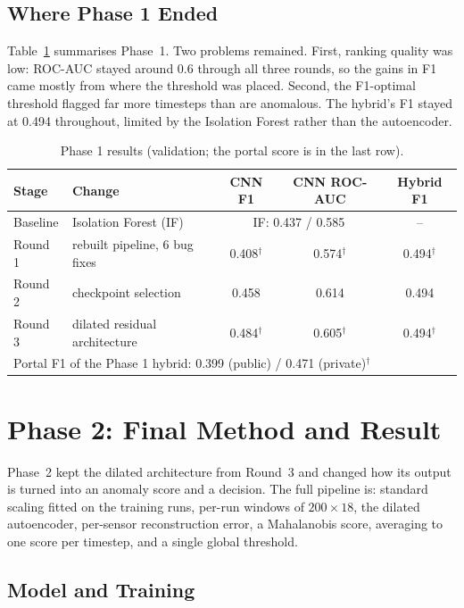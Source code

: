 \documentclass[runningheads]{llncs}
\newcommand{\doc}{$^\dagger$}
\begin{document}
\subsection{Where Phase 1 Ended}

Table~\ref{tab:phase1} summarises Phase~1. Two problems remained. First, ranking quality was low: ROC-AUC stayed around 0.6 through all three rounds, so the gains in F1 came mostly from where the threshold was placed. Second, the F1-optimal threshold flagged far more timesteps than are anomalous. The hybrid's F1 stayed at 0.494 throughout, limited by the Isolation Forest rather than the autoencoder.

\begin{table}[ht]
\centering
\caption{Phase 1 results (validation; the portal score is in the last row).}\label{tab:phase1}
\begin{tabular}{|l|l|c|c|c|}
\hline
Stage & Change & CNN F1 & CNN ROC-AUC & Hybrid F1 \\
\hline
Baseline & Isolation Forest (IF) & \multicolumn{2}{c|}{IF: 0.437 / 0.585} & -- \\
Round 1 & rebuilt pipeline, 6 bug fixes & 0.408\doc & 0.574\doc & 0.494\doc \\
Round 2 & checkpoint selection & 0.458 & 0.614 & 0.494 \\
Round 3 & dilated residual architecture & 0.484\doc & 0.605\doc & 0.494\doc \\
\hline
\multicolumn{5}{|l|}{Portal F1 of the Phase 1 hybrid: 0.399 (public) / 0.471 (private)\doc} \\
\hline
\end{tabular}
\end{table}

\section{Phase 2: Final Method and Result}\label{sec:phase2}

Phase~2 kept the dilated architecture from Round~3 and changed how its output is turned into an anomaly score and a decision. The full pipeline is: standard scaling fitted on the training runs, per-run windows of $200 \times 18$, the dilated autoencoder, per-sensor reconstruction error, a Mahalanobis score, averaging to one score per timestep, and a single global threshold.

\subsection{Model and Training}
\end{document}
